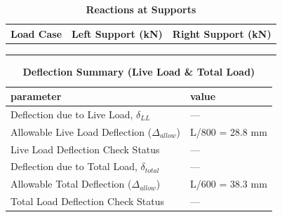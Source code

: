 \documentclass[12pt,a4paper]{report}
\numberwithin{table}{chapter}
\numberwithin{figure}{chapter}
\begin{document}
\vspace{1em}
\begin{longtable}{|>{\centering\arraybackslash}p{5.2cm}|>{\centering\arraybackslash}p{5.2cm}|>{\centering\arraybackslash}p{5.2cm}|}
\caption{\textbf{Reactions at Supports}}
\hline
\textbf{Load Case} & \textbf{Left Support (kN)} & \textbf{Right Support (kN)} \\[6pt]
\hline
 &  &  \\[6pt]
\hline
 &  &  \\[6pt]
\hline
 &  &  \\[6pt]
\hline
\end{longtable}

\vspace{1em}
\begin{longtable}{|L{7cm}|p{8.5cm}|}
\caption{\textbf{Deflection Summary (Live Load \& Total Load)}}
\hline
\textbf{parameter} & \textbf{value} \\
\hline
\textnormal{Deflection due to Live Load, $\delta_{LL}$} & --- \\[6pt]
\hline
\textnormal{Allowable Live Load Deflection ($\Delta_{allow}$)} & L/800 = 28.8 mm \\[6pt]
\hline
\textnormal{Live Load Deflection Check Status} & --- \\[6pt]
\hline
\textnormal{Deflection due to Total Load, $\delta_{total}$} & --- \\[6pt]
\hline
\textnormal{Allowable Total Deflection ($\Delta_{allow}$)} & L/600 = 38.3 mm \\[6pt]
\hline
\textnormal{Total Load Deflection Check Status} & --- \\[6pt]
\hline
\end{longtable}
\end{document}
